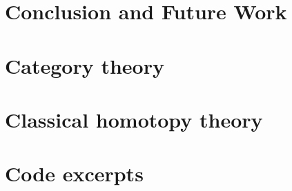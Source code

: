 \documentclass[12pt,openany]{book}
\theoremstyle{definition}
\begin{document}


\chapter{Conclusion and Future Work}




\appendix

\chapter{Category theory}

\chapter{Classical homotopy theory}

\chapter{Code excerpts}
\end{document}
